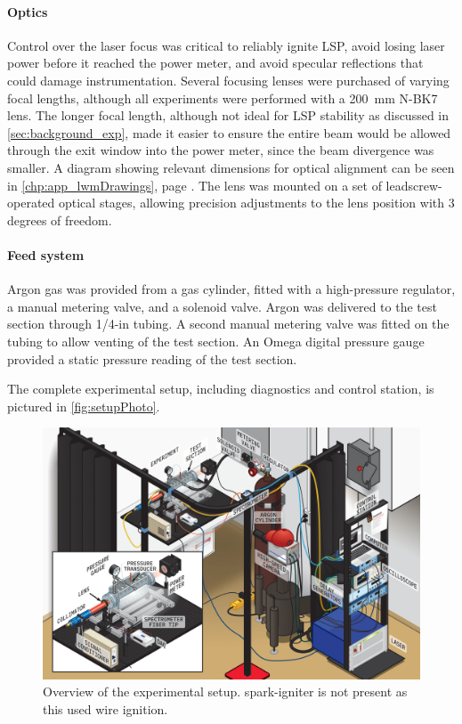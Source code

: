                \paragraph{Optics} Control over the laser focus was critical to reliably ignite LSP, avoid losing laser power before it reached the power meter, and avoid specular reflections that could damage instrumentation. Several focusing lenses were purchased of varying focal lengths, although all experiments were performed with a \qty{200}{mm} N-BK7 lens. The longer focal length, although not ideal for LSP stability as discussed in \autoref{sec:background_exp}, made it easier to ensure the entire beam would be allowed through the exit window into the power meter, since the beam divergence was smaller. A diagram showing relevant dimensions for optical alignment can be seen in \autoref{chp:app_lwmDrawings}, page \pageref*{chp:app_optics}. The lens was mounted on a set of leadscrew-operated optical stages, allowing precision adjustments to the lens position with 3 degrees of freedom.

                \paragraph{Feed system} Argon gas was provided from a gas cylinder, fitted with a high-pressure regulator, a manual metering valve, and a solenoid valve. Argon was delivered to the test section through 1/4-in tubing. A second manual metering valve was fitted on the tubing to allow venting of the test section. An Omega digital pressure gauge provided a static pressure reading of the test section.

                The complete experimental setup, including diagnostics and control station, is pictured in \autoref{fig:setupPhoto}.

                \begin{figure}[h]
                    \centering
                    \includegraphics[width=\textwidth]{assets/3 design/setup_isometric.png}
                    \caption[Overview of the experimental setup]{Overview of the experimental setup. spark-igniter is not present as this used wire ignition.}
                    \label{fig:setupPhoto}
                \end{figure}

